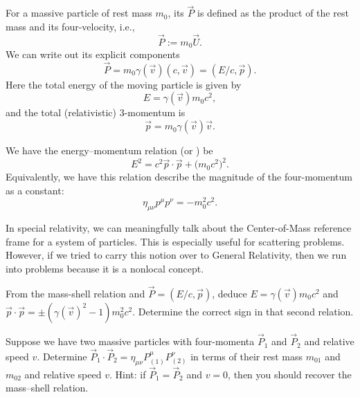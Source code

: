 \label{chunk:relativity:four-momentum}
For a massive particle of rest mass $m_{0}$, its 
$\vec{P}$ is defined as the product of the rest mass and its
four-velocity, i.e.,
\begin{equation}
\vec{P} := m_{0}\vec{U}.
\end{equation}
We can write out its explicit components
\begin{equation}
\vec{P} = m_{0}\gamma(\vec{v})(c, \vec{v}) = (E/c, \vec{p}).
\end{equation}
Here the total energy of the moving particle is given by
\begin{equation}
E = \gamma(\vec{v})m_{0}c^{2},
\end{equation}
and the total (relativistic) 3-momentum is
\begin{equation}
\vec{p} = m_{0}\gamma(\vec{v})\vec{v}.
\end{equation}

\label{chunk:relativity:mass-shell-relation}
We have the energy--momentum relation (or )
be
\begin{equation}
E^{2} = c^{2}\vec{p}\cdot\vec{p} + \bigl(m_{0}c^{2}\bigr)^{2}.
\end{equation}
Equivalently, we have this relation describe the magnitude of the
four-momentum as a constant:
\begin{equation}
\eta_{\mu\nu}p^{\mu}p^{\nu} = -m_{0}^{2}c^{2}.
\end{equation}

\begin{ddanger}
In special relativity, we can meaningfully talk about the Center-of-Mass
reference frame for a system of particles. This is especially useful for
scattering problems. However, if we tried to carry this notion over to
General Relativity, then we run into problems because it is a nonlocal
concept. 
\end{ddanger}

\begin{exercise}
From the mass-shell relation and $\vec{P} = (E/c, \vec{p})$, deduce
$E = \gamma(\vec{v})m_{0}c^{2}$ and 
$\vec{p}\cdot\vec{p}=\pm(\gamma(\vec{v})^{2}-1)m_{0}^{2}c^{2}$.
Determine the correct sign in that second relation.
\end{exercise}

\begin{exercise}
Suppose we have two massive particles with four-momenta $\vec{P}_{1}$
and $\vec{P}_{2}$ and relative speed $v$. Determine
$\vec{P}_{1}\cdot\vec{P}_{2}=\eta_{\mu\nu}P^{\mu}_{(1)}P^{\nu}_{(2)}$ in
terms of their rest mass $m_{01}$ and $m_{02}$ and relative speed $v$.
Hint: if $\vec{P}_{1}=\vec{P}_{2}$ and $v=0$, then you should recover
the mass--shell relation.
\end{exercise}

